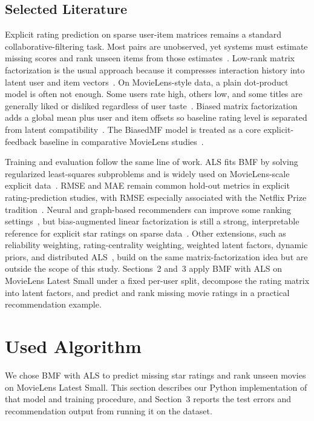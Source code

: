 \documentclass[conference]{IEEEtran}
\begin{document}
\subsection{Selected Literature}

Explicit rating prediction on sparse user-item matrices remains a standard collaborative-filtering task. Most pairs are unobserved, yet systems must estimate missing scores and rank unseen items from those estimates~\cite{ref3,ref4}. Low-rank matrix factorization is the usual approach because it compresses interaction history into latent user and item vectors~\cite{ref3,ref6}. On MovieLens-style data, a plain dot-product model is often not enough. Some users rate high, others low, and some titles are generally liked or disliked regardless of user taste~\cite{ref2}. Biased matrix factorization adds a global mean plus user and item offsets so baseline rating level is separated from latent compatibility~\cite{ref2,ref3}. The BiasedMF model is treated as a core explicit-feedback baseline in comparative MovieLens studies~\cite{ref1,ref2,ref5}.

Training and evaluation follow the same line of work. ALS fits BMF by solving regularized least-squares subproblems and is widely used on MovieLens-scale explicit data~\cite{ref1,ref2}. RMSE and MAE remain common hold-out metrics in explicit rating-prediction studies, with RMSE especially associated with the Netflix Prize tradition~\cite{ref4,ref5}. Neural and graph-based recommenders can improve some ranking settings~\cite{ref6,ref10}, but bias-augmented linear factorization is still a strong, interpretable reference for explicit star ratings on sparse data~\cite{ref1,ref2,ref6}. Other extensions, such as reliability weighting, rating-centrality weighting, weighted latent factors, dynamic priors, and distributed ALS~\cite{ref7,ref8,ref9,ref11,ref12}, build on the same matrix-factorization idea but are outside the scope of this study. Sections~2 and~3 apply BMF with ALS on MovieLens Latest Small under a fixed per-user split, decompose the rating matrix into latent factors, and predict and rank missing movie ratings in a practical recommendation example.

\section{Used Algorithm}

We chose BMF with ALS to predict missing star ratings and rank unseen movies on MovieLens Latest Small. This section describes our Python implementation of that model and training procedure, and Section~3 reports the test errors and recommendation output from running it on the dataset.
\end{document}
